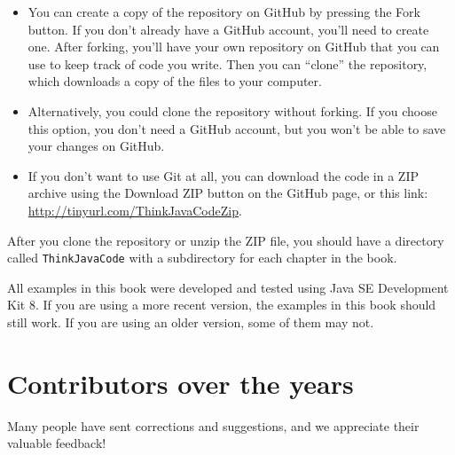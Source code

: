 \documentclass[12pt]{book}
\theoremstyle{exercise}
\begin{document}
\begin{itemize}

\item You can create a copy of the repository on GitHub by pressing the {\sf Fork} button.
If you don't already have a GitHub account, you'll need to create one.
After forking, you'll have your own repository on GitHub that you can use to keep track of code you write.
Then you can ``clone'' the repository, which downloads a copy of the files to your computer.

\item Alternatively, you could clone the repository without forking.
If you choose this option, you don't need a GitHub account, but you won't be able to save your changes on GitHub.

\item If you don't want to use Git at all, you can download the code in a ZIP archive using the {\sf Download ZIP} button on the GitHub page, or this link: \url{http://tinyurl.com/ThinkJavaCodeZip}.

\end{itemize}

After you clone the repository or unzip the ZIP file, you should have a directory called {\tt ThinkJavaCode} with a subdirectory for each chapter in the book.

All examples in this book were developed and tested using Java SE Development Kit 8.
If you are using a more recent version, the examples in this book should still work.
If you are using an older version, some of them may not.


\section*{Contributors over the years}


Many people have sent corrections and suggestions, and we appreciate their valuable feedback!
\end{document}
